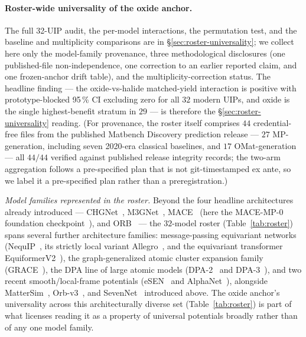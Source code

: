 \documentclass[aip,jcp,preprint,superscriptaddress,amsmath,amssymb]{revtex4-2}
\begin{document}
\paragraph{Roster-wide universality of the oxide anchor.} The full 32-UIP audit, the per-model interactions, the permutation test, and the baseline and multiplicity comparisons are in \S\ref{sec:roster-universality}; we collect here only the model-family provenance, three methodological disclosures (one published-file non-independence, one correction to an earlier reported claim, and one frozen-anchor drift table), and the multiplicity-correction status. The headline finding --- the oxide-vs-halide matched-yield interaction is positive with prototype-blocked 95\,\% CI excluding zero for all $32$ modern UIPs, and oxide is the single highest-benefit stratum in $29$ --- is therefore the \S\ref{sec:roster-universality} reading. (For provenance, the roster itself comprises $44$ credential-free files from the published Matbench Discovery prediction release --- $27$ MP-generation, including seven 2020-era classical baselines, and $17$ OMat-generation --- all $44/44$ verified against published release integrity records; the two-arm aggregation follows a pre-specified plan that is not git-timestamped ex ante, so we label it a pre-specified plan rather than a preregistration.)

\emph{Model families represented in the roster.} Beyond the four headline architectures already
introduced --- CHGNet~\citep{deng2023}, M3GNet~\citep{chen2022}, MACE~\citep{batatia2022mace}
(here the MACE-MP-0 foundation checkpoint~\citep{batatia2024macemp0}), and ORB~\citep{neumann2024}
--- the $32$-model roster (Table~\ref{tab:roster}) spans several further architecture families:
message-passing equivariant networks (NequIP~\citep{nequip2022}, its strictly local variant
Allegro~\citep{allegro2023}, and the equivariant transformer EquiformerV2~\citep{liao2024equiformerv2}),
the graph-generalized atomic cluster expansion family (GRACE~\citep{grace2024}), the DPA line of
large atomic models (DPA-2~\citep{zhang2024dpa2} and DPA-3~\citep{zhang2025dpa3}), and two recent
smooth/local-frame potentials (eSEN~\citep{fu2025esen} and AlphaNet~\citep{yin2025alphanet}),
alongside MatterSim~\citep{yang2024mattersim}, Orb-v3~\citep{rhodes2025orbv3}, and
SevenNet~\citep{park2024sevennet,sevennet} introduced above. The oxide anchor's universality
across this architecturally diverse set (Table~\ref{tab:roster}) is part of what licenses reading
it as a property of universal potentials broadly rather than of any one model family.
\end{document}
